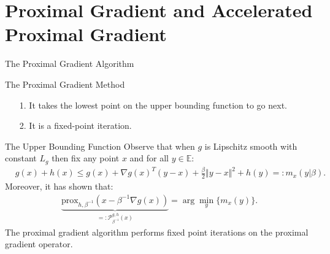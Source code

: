 \documentclass[11pt]{beamer}
\begin{document}
\section{Proximal Gradient and Accelerated Proximal Gradient}
    \begin{frame}{The Proximal Gradient Algorithm}
        \begin{block}{The Proximal Gradient Method}
            \begin{algorithm}[H]
                \scriptsize
                \begin{algorithmic}[1]
                    \ENDIF
                \ENDFOR
                \end{algorithmic}
                \caption{Proximal Gradient With Fixed Step-sizes}
                \label{alg:1}
            \end{algorithm}
        \end{block}
        \begin{itemize}
            \item [1.] It takes the lowest point on the upper bounding function to go next. 
            \item [2.] It is a fixed-point iteration.
        \end{itemize}
    \end{frame}
    \begin{frame}{The Upper Bounding Function}
        Observe that when $g$ is Lipschitz smooth with constant $L_g$ then fix any point $x$ and for all $y\in \mathbb E$:  
        \begin{align*}
            & g(x) + h(x) \le 
            g(x) + \nabla g(x)^T(y - x) + \frac{\beta}{2} \Vert y - x\Vert^2
            + h(y) =: m_x(y|\beta). 
        \end{align*}
        Moreover, it has shown that: 
        \begin{align*}
            \underbrace{\text{prox}_{h, \beta^{-1}}(x - \beta^{-1}\nabla g(x))}_{=:\mathcal P_{\beta^{-1}}^{g, h}(x)} 
            = \arg\min_{y} \{m_x(y)\}.  
        \end{align*}
        The proximal gradient algorithm performs fixed point iterations on the proximal gradient operator. 
    \end{frame}
\end{document}
